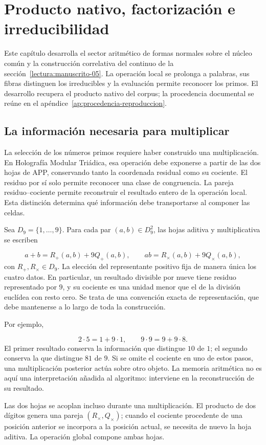 \section{Producto nativo, factorización e irreducibilidad}
\label{lectura:manuscrito-01}
Este capítulo desarrolla el sector aritmético de formas normales sobre el núcleo común y la construcción correlativa del continuo de la sección~\ref{lectura:manuscrito-05}. La operación local se prolonga a palabras, sus fibras distinguen los irreducibles y la evaluación permite reconocer los primos. El desarrollo recupera el producto nativo del corpus; la procedencia documental se reúne en el apéndice~\ref{ap:procedencia-reproduccion}.

\subsection{La información necesaria para multiplicar}
La selección de los números primos requiere haber construido una multiplicación. En Holografía Modular Triádica, esa operación debe exponerse a partir de las dos hojas de APP, conservando tanto la coordenada residual como su cociente. El residuo por sí solo permite reconocer una clase de congruencia. La pareja residuo–cociente permite reconstruir el resultado entero de la operación local. Esta distinción determina qué información debe transportarse al componer las celdas.

Sea $D_9=\{1,\ldots,9\}$. Para cada par $(a,b)\in D_9^2$, las hojas aditiva y multiplicativa se escriben

\[
a+b=R_+(a,b)+9Q_+(a,b),\qquad
ab=R_\times(a,b)+9Q_\times(a,b),
\]
con $R_+,R_\times\in D_9$. La elección del representante positivo fija de manera única los cuatro datos. En particular, un resultado divisible por nueve tiene residuo representado por $9$, y su cociente es una unidad menor que el de la división euclídea con resto cero. Se trata de una convención exacta de representación, que debe mantenerse a lo largo de toda la construcción.

Por ejemplo,

\[
2\cdot5=1+9\cdot1,\qquad 9\cdot9=9+9\cdot8.
\]
El primer resultado conserva la información que distingue $10$ de $1$; el segundo conserva la que distingue $81$ de $9$. Si se omite el cociente en uno de estos pasos, una multiplicación posterior actúa sobre otro objeto. La memoria aritmética no es aquí una interpretación añadida al algoritmo: interviene en la reconstrucción de su resultado.

Las dos hojas se acoplan incluso durante una multiplicación. El producto de dos dígitos genera una pareja $(R_\times,Q_\times)$; cuando el cociente procedente de una posición anterior se incorpora a la posición actual, se necesita de nuevo la hoja aditiva. La operación global compone ambas hojas.

